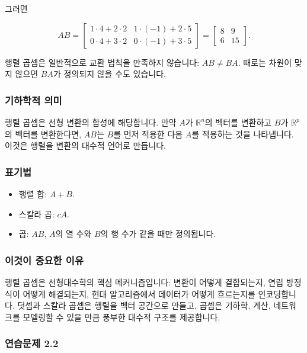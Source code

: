 \documentclass[
  12pt,
  a4paper,
]{article}
\begin{document}
그러면

\[AB = \begin{bmatrix}
1\cdot4 + 2\cdot2 & 1\cdot(-1) + 2\cdot5 \\
0\cdot4 + 3\cdot2 & 0\cdot(-1) + 3\cdot5
\end{bmatrix} =
\begin{bmatrix}
8 & 9 \\
6 & 15
\end{bmatrix}.\]

행렬 곱셈은 일반적으로 교환 법칙을 만족하지 않습니다: \(AB \neq BA\). 때로는 차원이 맞지 않으면 \(BA\)가 정의되지 않을 수도 있습니다.

\subsubsection{기하학적 의미}\label{geometric-meaning}

행렬 곱셈은 선형 변환의 합성에 해당합니다. 만약 \(A\)가 \(\mathbb{R}^n\)의 벡터를 변환하고 \(B\)가 \(\mathbb{R}^p\)의 벡터를 변환한다면, \(AB\)는 \(B\)를 먼저 적용한 다음 \(A\)를 적용하는 것을 나타냅니다. 이것은 행렬을 변환의 대수적 언어로 만듭니다.

\subsubsection{표기법}\label{notation-5}

\begin{itemize}
\item
  행렬 합: \(A+B\).
\item
  스칼라 곱: \(cA\).
\item
  곱: \(AB\), \(A\)의 열 수와 \(B\)의 행 수가 같을 때만 정의됩니다.
\end{itemize}

\subsubsection{이것이 중요한 이유}\label{why-this-matters-5}

행렬 곱셈은 선형대수학의 핵심 메커니즘입니다: 변환이 어떻게 결합되는지, 연립 방정식이 어떻게 해결되는지, 현대 알고리즘에서 데이터가 어떻게 흐르는지를 인코딩합니다. 덧셈과 스칼라 곱셈은 행렬을 벡터 공간으로 만들고, 곱셈은 기하학, 계산, 네트워크를 모델링할 수 있을 만큼 풍부한 대수적 구조를 제공합니다.

\subsubsection{연습문제 2.2}\label{exercises-22}
\end{document}
